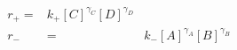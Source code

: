 \begin{eqnarray}
r_+  = & k_+[C]^{\gamma_C}[D]^{\gamma_D} \\
r_- & = & k_-[A]^{\gamma_A}[B]^{\gamma_B} \\
\end{eqnarray}